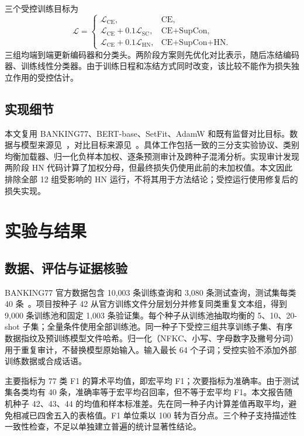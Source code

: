 \documentclass[runningheads]{llncs}
\begin{document}
三个受控训练目标为
\begin{equation}
\mathcal L=\begin{cases}
\mathcal L_{\mathrm{CE}},&\text{CE},\\
\mathcal L_{\mathrm{CE}}+0.1\mathcal L_{\mathrm{SC}},&\text{CE+SupCon},\\
\mathcal L_{\mathrm{CE}}+0.1\mathcal L_{\mathrm{HN}},&\text{CE+SupCon+HN}.
\end{cases}
\end{equation}
三组均端到端更新编码器和分类头。两阶段方案则先优化对比表示，随后冻结编码器、训练线性分类器。由于训练日程和冻结方式同时改变，该比较不能作为损失独立作用的受控估计。

\subsection{实现细节}
本文复用 BANKING77、BERT-base、SetFit、AdamW 和既有监督对比目标。数据与模型来源见~\cite{banking,bert,setfit}，对比目标来源见~\cite{supcon,gunel}。具体工作包括一致的三分支实验协议、类别均衡加载器、归一化负样本加权、逐条预测审计及跨种子混淆分析。实现审计发现两阶段 HN 代码计算了加权分母，但最终损失仍使用此前的未加权值。本文因此排除全部 12 组受影响的 HN 运行，不将其用于方法结论；受控运行使用修复后的损失实现。

\section{实验与结果}
\subsection{数据、评估与证据核验}
BANKING77 官方数据包含 10,003 条训练查询和 3,080 条测试查询，测试集每类 40 条~\cite{banking}。项目按种子 42 从官方训练文件分层划分并修复同类重复文本组，得到 9,000 条训练池和固定 1,003 条验证集。每个种子从训练池抽取均衡的 5、10、20-shot 子集；全量条件使用全部训练池。同一种子下受控三组共享训练子集、有序数据指纹及预训练模型文件哈希。归一化（NFKC、小写、字母数字及撇号分词）用于重复审计，不替换模型原始输入。输入最长 64 个子词；受控实验不添加外部训练数据或合成话语。

主要指标为 77 类 F1 的算术平均值，即宏平均 F1；次要指标为准确率。由于测试集各类均有 40 条，准确率等于宏平均召回率，但不等于宏平均 F1。本文报告随机种子 42、43、44 的均值和样本标准差。先在同一种子内计算差值再取平均，避免相减已四舍五入的表格值。F1 单位乘以 100 转为百分点。三个种子支持描述性一致性检查，不足以单独建立普遍的统计显著性结论。
\end{document}
